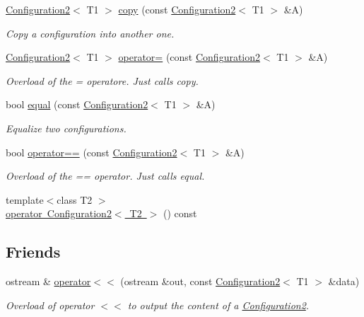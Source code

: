 \begin{DoxyCompactItemize}
\mbox{\hyperlink{class_configuration2}{Configuration2}}$<$ T1 $>$ \mbox{\hyperlink{class_configuration2_a8b0bb9f80a69ff8d70af39adf97ceb46}{copy}} (const \mbox{\hyperlink{class_configuration2}{Configuration2}}$<$ T1 $>$ \&A)
\begin{DoxyCompactList}\small\item\em Copy a configuration into another one. \end{DoxyCompactList}\item 
\mbox{\hyperlink{class_configuration2}{Configuration2}}$<$ T1 $>$ \mbox{\hyperlink{class_configuration2_a9ef2f57ddcc1f0c8117a9ed2f13141aa}{operator=}} (const \mbox{\hyperlink{class_configuration2}{Configuration2}}$<$ T1 $>$ \&A)
\begin{DoxyCompactList}\small\item\em Overload of the = operatore. Just calls {\ttfamily copy}. \end{DoxyCompactList}\item 
bool \mbox{\hyperlink{class_configuration2_a1744207d1346e2ec554795255a58c241}{equal}} (const \mbox{\hyperlink{class_configuration2}{Configuration2}}$<$ T1 $>$ \&A)
\begin{DoxyCompactList}\small\item\em Equalize two configurations. \end{DoxyCompactList}\item 
bool \mbox{\hyperlink{class_configuration2_a7dda6b86ded2376a78a7f3d9f2811740}{operator==}} (const \mbox{\hyperlink{class_configuration2}{Configuration2}}$<$ T1 $>$ \&A)
\begin{DoxyCompactList}\small\item\em Overload of the == operator. Just calls {\ttfamily equal}. \end{DoxyCompactList}\item 
{\footnotesize template$<$class T2 $>$ }\\\mbox{\hyperlink{class_configuration2_a3bc8dfea259f6d3f97f6770c09ff6526}{operator Configuration2$<$ T2 $>$}} () const
\end{DoxyCompactItemize}
\subsection*{Friends}
\begin{DoxyCompactItemize}
\item 
ostream \& \mbox{\hyperlink{class_configuration2_a90aec83947c9087504b4a9b6f0db8205}{operator$<$$<$}} (ostream \&out, const \mbox{\hyperlink{class_configuration2}{Configuration2}}$<$ T1 $>$ \&data)
\begin{DoxyCompactList}\small\item\em Overload of operator $<$$<$ to output the content of a {\ttfamily \mbox{\hyperlink{class_configuration2}{Configuration2}}}. \end{DoxyCompactList}\end{DoxyCompactItemize}


